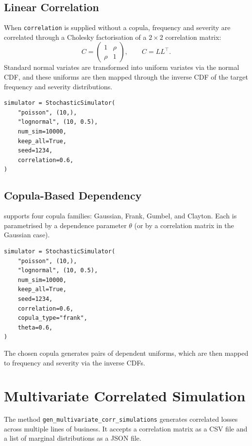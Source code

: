 \subsection{Linear Correlation}

When \texttt{correlation} is supplied without a copula, frequency and
severity are correlated through a Cholesky factorisation of a $2 \times 2$
correlation matrix:
\[
    C = \begin{pmatrix} 1 & \rho \\ \rho & 1 \end{pmatrix},
    \qquad C = L L^{\top}.
\]
Standard normal variates are transformed into uniform variates via the
normal CDF, and these uniforms are then mapped through the inverse CDF of
the target frequency and severity distributions.

\begin{lstlisting}[style=pythonstyle]
simulator = StochasticSimulator(
    "poisson", (10,),
    "lognormal", (10, 0.5),
    num_sim=10000,
    keep_all=True,
    seed=1234,
    correlation=0.6,
)
\end{lstlisting}

\subsection{Copula-Based Dependency}

\actsim supports four copula families: Gaussian, Frank, Gumbel, and
Clayton. Each is parametrised by a dependence parameter
$\theta$ (or by a correlation matrix in the Gaussian case).

\begin{lstlisting}[style=pythonstyle]
simulator = StochasticSimulator(
    "poisson", (10,),
    "lognormal", (10, 0.5),
    num_sim=10000,
    keep_all=True,
    seed=1234,
    correlation=0.6,
    copula_type="frank",
    theta=0.6,
)
\end{lstlisting}

The chosen copula generates pairs of dependent uniforms, which are then
mapped to frequency and severity via the inverse CDFs.

\section{Multivariate Correlated Simulation}

The method \texttt{gen\_multivariate\_corr\_simulations} generates
correlated losses across multiple lines of business. It accepts a
correlation matrix as a CSV file and a list of marginal distributions as
a JSON file.

